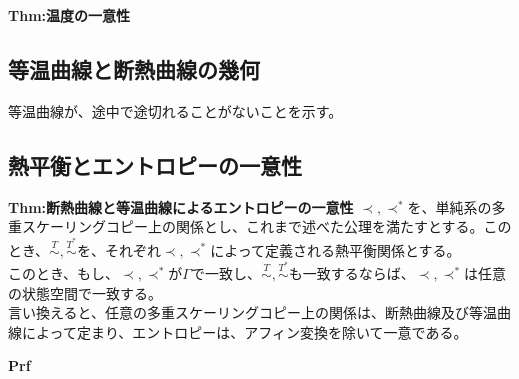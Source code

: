 \documentclass[a4paper,11pt]{jsarticle}
\begin{document}
\begin{itembox}[l]{\textbf{Thm:温度の一意性}}

\end{itembox}
\subsection{等温曲線と断熱曲線の幾何}
等温曲線が、途中で途切れることがないことを示す。\\  

\subsection{熱平衡とエントロピーの一意性}
\begin{itembox}[l]{\textbf{Thm:断熱曲線と等温曲線によるエントロピーの一意性}}
    $\prec,\prec^{*}$を、単純系の多重スケーリングコピー上の関係とし、これまで述べた公理を満たすとする。このとき、$\overset{T}{\sim},\overset{T^{*}}{\sim}$を、それぞれ$\prec,\prec^{*}$によって定義される熱平衡関係とする。\\
    このとき、もし、$\prec,\prec^{*}$が$\Gamma$で一致し、$\overset{T}{\sim},\overset{T^{*}}{\sim}$も一致するならば、$\prec,\prec^{*}$は任意の状態空間で一致する。\\
    言い換えると、任意の多重スケーリングコピー上の関係は、断熱曲線及び等温曲線によって定まり、エントロピーは、アフィン変換を除いて一意である。
\end{itembox}
\textbf{Prf}\\
\end{document}
